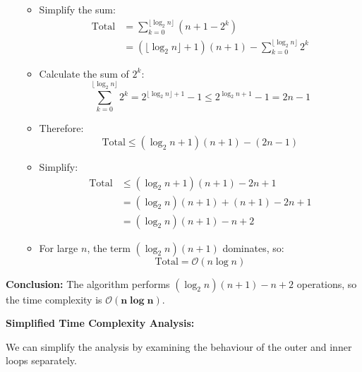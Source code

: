 \begin{example}
\begin{itemize}
\begin{itemize}
\[            \]
            \item Simplify the sum:
            \[
            \begin{aligned}
            \text{Total} &= \sum_{k=0}^{\lfloor \log_2 n \rfloor} (n + 1 - 2^k) \\
            &= (\lfloor \log_2 n \rfloor + 1)(n + 1) - \sum_{k=0}^{\lfloor \log_2 n \rfloor} 2^k
            \end{aligned}
            \]
            \item Calculate the sum of $2^k$:
            \[
            \sum_{k=0}^{\lfloor \log_2 n \rfloor} 2^k = 2^{\lfloor \log_2 n \rfloor + 1} - 1 \leq 2^{\log_2 n + 1} - 1 = 2n -1
            \]
            \item Therefore:
            \[
            \text{Total} \leq (\log_2 n +1)(n +1) - (2n -1)
            \]
            \item Simplify:
            \[
            \begin{aligned}
            \text{Total} &\leq (\log_2 n +1)(n +1) - 2n +1 \\
            &= (\log_2 n)(n +1) + (n +1) - 2n +1 \\
            &= (\log_2 n)(n +1) - n +2
            \end{aligned}
            \]
            \item For large $n$, the term $(\log_2 n)(n +1)$ dominates, so:
            \[
            \text{Total} = \mathcal{O}(n \log n)
            \]
        \end{itemize}
    \end{itemize}
    
    \textbf{Conclusion:} The algorithm performs $(\log_2 n)(n +1) - n +2$ operations, so the time complexity is $\boldsymbol{\mathcal{O}(n \log n)}$.

    \textbf{Simplified Time Complexity Analysis:}

    We can simplify the analysis by examining the behaviour of the outer and inner loops separately.


\end{example}
